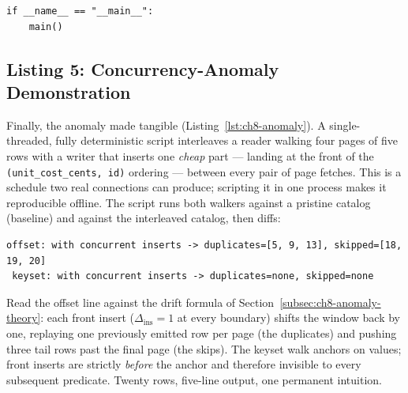\begin{verbatim}
if __name__ == "__main__":
    main()
\end{verbatim}

\subsection{Listing 5: Concurrency-Anomaly Demonstration}
\label{subsec:ch8-anomaly-demo}

Finally, the anomaly made tangible (Listing~\ref{lst:ch8-anomaly}). A
single-threaded, fully deterministic script interleaves a reader walking
four pages of five rows with a writer that inserts one \emph{cheap} part ---
landing at the front of the \texttt{(unit\_cost\_cents, id)} ordering ---
between every pair of page fetches. This is a schedule two real connections
can produce; scripting it in one process makes it reproducible offline. The
script runs both walkers against a pristine catalog (baseline) and against
the interleaved catalog, then diffs:

\begin{verbatim}
offset: with concurrent inserts -> duplicates=[5, 9, 13], skipped=[18, 19, 20]
 keyset: with concurrent inserts -> duplicates=none, skipped=none
\end{verbatim}

Read the offset line against the drift formula of
Section~\ref{subsec:ch8-anomaly-theory}: each front insert
($\Delta_{\mathrm{ins}} = 1$ at every boundary) shifts the window back by
one, replaying one previously emitted row per page (the duplicates) and
pushing three tail rows past the final page (the skips). The keyset walk
anchors on values; front inserts are strictly \emph{before} the anchor and
therefore invisible to every subsequent predicate. Twenty rows, five-line
output, one permanent intuition.

